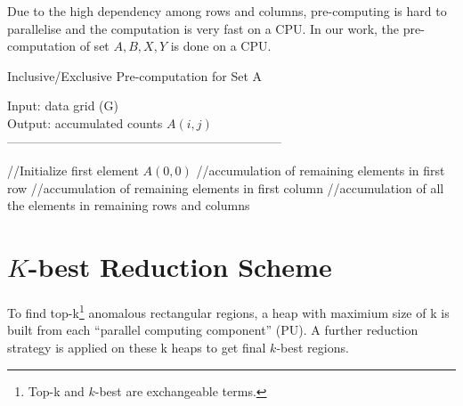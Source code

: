 \documentclass[AMA,LATO1COL]{WileyNJD-v2}
\begin{document}
Due to the high dependency among rows and columns, pre-computing is hard to parallelise and the computation is very fast on a CPU. In our work, the pre-computation of set $A, B, X, Y$ is done on a CPU.

\begin{algorithm}[t!]
\caption{Inclusive/Exclusive Pre-computation for Set A}\label{preinex}
Input: data grid (G) \\
Output: accumulated counts $A(i,j)$\\
------------------------------------------------------------------ \\
\begin{algorithmic}[1]
\State //Initialize first element $A(0,0)$
\State //accumulation of remaining elements in first row
\EndFor
\State //accumulation of remaining elements in first column
\EndFor
\State //accumulation of all the elements in remaining rows and columns
\EndFor
{}
\EndFor
\EndFor
\end{algorithmic}
\end{algorithm}
\section{ $K$-best Reduction Scheme}\label{KBEST}
To find top-k\footnote{Top-k and $k$-best are exchangeable terms.} anomalous rectangular regions, a heap with maximium size of k is built from each ``parallel computing component'' (PU). A further reduction strategy is applied on these k heaps to get final $k$-best regions.
\end{document}
